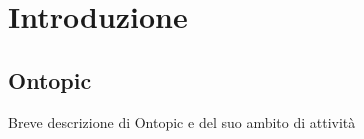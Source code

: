 \chapter{Introduzione}
\label{cha:ontopic}
\section{Ontopic}
Breve descrizione di Ontopic e del suo ambito di attività
